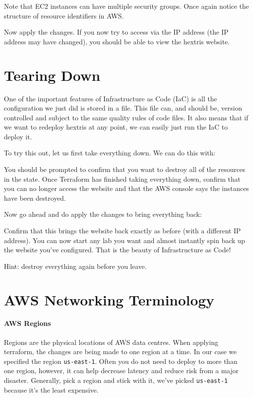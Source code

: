 \documentclass{csse4400}
\begin{document}
Note that EC2 instances can have multiple security groups.
Once again notice the structure of resource identifiers in AWS.


Now apply the changes.
If you now try to access via the IP address
(the IP address may have changed),
you should be able to view the hextris website.

\section{Tearing Down}

One of the important features of Infrastructure as Code (IaC) is all the configuration we just did is stored in a file.
This file can, and should be, version controlled and subject to the same quality rules of code files.
It also means that if we want to redeploy hextris at any point,
we can easily just run the IaC to deploy it.

To try this out, let us first take everything down.
We can do this with:

You should be prompted to confirm that you want to destroy all of the resources in the state.
Once Terraform has finished taking everything down,
confirm that you can no longer access the website and that the AWS console says the instances have been destroyed.

Now go ahead and do apply the changes to bring everything back:

Confirm that this brings the website back exactly as before (with a different IP address).
You can now start any lab you want and almost instantly spin back up the website you've configured.
That is the beauty of Infrastructure as Code!

Hint: destroy everything again before you leave.




\appendix

\section{AWS Networking Terminology}
\paragraph{AWS Regions}
Regions are the physical locations of AWS data centres.
When applying terraform, the changes are being made to one region at a time.
In our case we specified the region \texttt{us-east-1}.
Often you do not need to deploy to more than one region, however,
it can help decrease latency and reduce risk from a major disaster.
Generally, pick a region and stick with it,
we've picked \texttt{us-east-1} because it's the least expensive.
\end{document}
